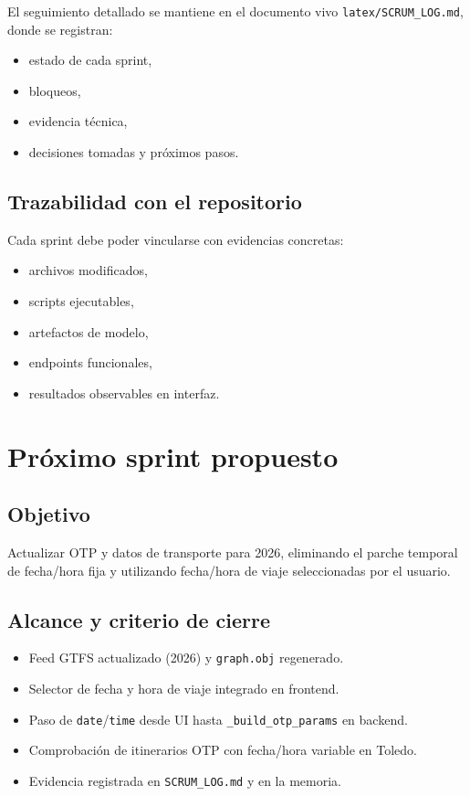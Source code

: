 El seguimiento detallado se mantiene en el documento vivo \texttt{latex/SCRUM\_LOG.md}, donde se registran:

\begin{itemize}
  \item estado de cada sprint,
  \item bloqueos,
  \item evidencia técnica,
  \item decisiones tomadas y próximos pasos.
\end{itemize}

\subsection{Trazabilidad con el repositorio}

Cada sprint debe poder vincularse con evidencias concretas:

\begin{itemize}
  \item archivos modificados,
  \item scripts ejecutables,
  \item artefactos de modelo,
  \item endpoints funcionales,
  \item resultados observables en interfaz.
\end{itemize}

\section{Próximo sprint propuesto}

\subsection{Objetivo}

Actualizar OTP y datos de transporte para 2026, eliminando el parche temporal de fecha/hora fija y utilizando fecha/hora de viaje seleccionadas por el usuario.

\subsection{Alcance y criterio de cierre}

\begin{itemize}
  \item Feed GTFS actualizado (2026) y \texttt{graph.obj} regenerado.
  \item Selector de fecha y hora de viaje integrado en frontend.
  \item Paso de \texttt{date}/\texttt{time} desde UI hasta \texttt{\_build\_otp\_params} en backend.
  \item Comprobación de itinerarios OTP con fecha/hora variable en Toledo.
  \item Evidencia registrada en \texttt{SCRUM\_LOG.md} y en la memoria.
\end{itemize}

